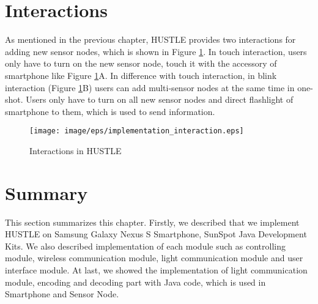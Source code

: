 \section{Interactions}

As mentioned in the previous chapter, HUSTLE provides two interactions for adding new sensor nodes, which is shown in Figure \ref{fig:implementation_interactions}. In touch interaction, users only have to turn on the new sensor node, touch it with the accessory of smartphone like Figure \ref{fig:implementation_interactions}A. In difference with touch interaction, in blink interaction (Figure \ref{fig:implementation_interactions}B) users can add multi-sensor nodes at the same time in one-shot. Users only have to turn on all new sensor nodes and direct flashlight of smartphone to them, which is used to send information.

\begin{figure}[hbtp]
\centering
\texttt{[image: image/eps/implementation\_interaction.eps]}
\caption{Interactions in HUSTLE}
\label{fig:implementation_interactions}
\end{figure}

\section{Summary}
This section summarizes this chapter. Firstly, we described that we implement HUSTLE on Samsung Galaxy Nexus S Smartphone, SunSpot Java Development Kits. We also described implementation of each module such as controlling module, wireless communication module, light communication module and user interface module. At last, we showed the implementation of light communication module, encoding and decoding part with Java code, which is used in Smartphone and Sensor Node.

